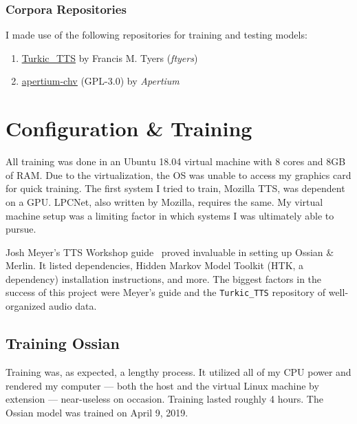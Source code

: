 \documentclass[11pt,a4paper]{article}
\begin{document}
\subsubsection{Corpora Repositories}
I made use of the following repositories for training and testing models:

\begin{enumerate}
	\item \href{https://github.com/ftyers/Turkic_TTS}{\underline{Turkic\_TTS}} by Francis M. Tyers (\textit{ftyers})
	\item \href{https://github.com/apertium/apertium-chv}{\underline{apertium-chv}} (GPL-3.0) by \textit{Apertium}
\end{enumerate}

\section{Configuration \& Training}
All training was done in an Ubuntu 18.04 virtual machine with 8 cores and 8GB of RAM. Due to the virtualization, the OS was unable to access my graphics card for quick training. The first system I tried to train, Mozilla TTS, was dependent on a GPU. LPCNet, also written by Mozilla, requires the same. My virtual machine setup was a limiting factor in which systems I was ultimately able to pursue.

Josh Meyer's TTS Workshop guide~\cite{jrmeyer-voice} proved invaluable in setting up Ossian \& Merlin. It listed dependencies, Hidden Markov Model Toolkit (HTK, a dependency) installation instructions, and more. The biggest factors in the success of this project were Meyer's guide and the \texttt{Turkic\_TTS} repository of well-organized audio data.

\subsection{Training Ossian}
Training was, as expected, a lengthy process. It utilized all of my CPU power and rendered my computer --- both the host and the virtual Linux machine by extension --- near-useless on occasion. Training lasted roughly 4 hours. The Ossian model was trained on April 9, 2019.
\end{document}
